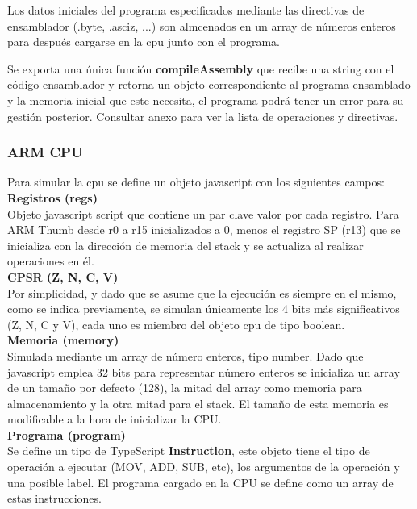 {        Los datos iniciales del programa especificados mediante las directivas de ensamblador (.byte, .asciz, ...)
        son almcenados en un array de números enteros para después cargarse en la cpu junto con el programa.

        Se exporta una única función \textbf{compileAssembly} que recibe una string con el código ensamblador y retorna un objeto
        correspondiente al programa ensamblado y la memoria inicial que este necesita, el programa podrá tener un error
        para su gestión posterior. Consultar anexo para ver la lista de operaciones y directivas. 

        \subsubsection{ARM CPU}
        Para simular la cpu se define un objeto javascript con los siguientes campos: \\

        \textbf{Registros (regs)} \\
        Objeto javascript script que contiene un par clave valor por cada registro.
        Para ARM Thumb desde r0 a r15 inicializados a 0, menos el registro SP (r13)
        que se inicializa con la dirección de memoria del stack y se actualiza al realizar operaciones en él. \\

        \textbf{CPSR (Z, N, C, V)} \\
        Por simplicidad, y dado que se asume que la ejecución es siempre en el mismo, como se indica previamente,
        se simulan únicamente los 4 bits más significativos (Z, N, C y V), cada uno es miembro del objeto cpu
        de tipo boolean. \\

        \textbf{Memoria (memory)} \\
        Simulada mediante un array de número enteros, tipo number. Dado que javascript emplea 32 bits para representar número enteros
        se inicializa un array de un tamaño por defecto (128), la mitad del array como memoria para almacenamiento y la otra mitad para el stack.
        El tamaño de esta memoria es modificable a la hora de inicializar la CPU. \\
        
        \textbf{Programa (program)} \\
        Se define un tipo de TypeScript \textbf{Instruction}, este objeto tiene el tipo de operación a ejecutar
        (MOV, ADD, SUB, etc), los argumentos de la operación y una posible label. El programa cargado en la CPU se define como un array de estas instrucciones. \\

}

